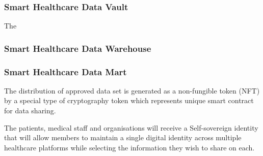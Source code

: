 \subsubsection{Smart Healthcare Data Vault}
The 

\subsubsection{Smart Healthcare Data Warehouse}


\subsubsection{Smart Healthcare Data Mart}

The distribution of approved data set is generated as a non-fungible token (NFT) by a special type of cryptography token which represents unique smart contract for data sharing.

The patients, medical staff and organisations will receive a Self-sovereign identity that will allow members to maintain a single digital identity across multiple healthcare platforms while selecting the information they wish to share on each.